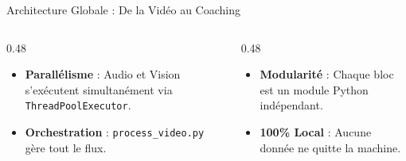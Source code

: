 \documentclass[10pt,aspectratio=169]{beamer}
\begin{document}
\begin{frame}{Architecture Globale : De la Vidéo au Coaching}
    
    \vspace{0.4cm}
    \begin{columns}[T]
        \begin{column}{0.48\textwidth}
            \begin{itemize} \scriptsize
                \item \textbf{Parallélisme} : Audio et Vision s'exécutent simultanément via \texttt{ThreadPoolExecutor}.
                \item \textbf{Orchestration} : \texttt{process\_video.py} gère tout le flux.
            \end{itemize}
        \end{column}
        \begin{column}{0.48\textwidth}
            \begin{itemize} \scriptsize
                \item \textbf{Modularité} : Chaque bloc est un module Python indépendant.
                \item \textbf{100\% Local} : Aucune donnée ne quitte la machine.
            \end{itemize}
        \end{column}
    \end{columns}
\end{frame}
\end{document}
